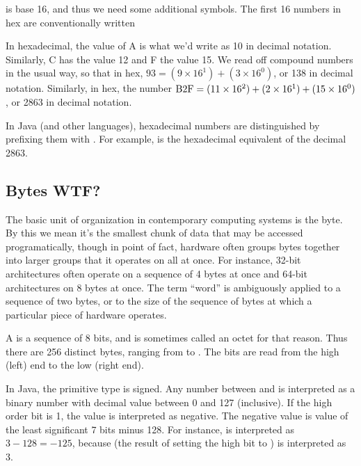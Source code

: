  is base 16, 
and thus we need some additional symbols.  The first 16 numbers in hex
are conventionally written


In hexadecimal, the value of A is what we'd write as 10 in decimal
notation.  Similarly, C has the value 12 and F the value 15.  We read
off compound numbers in the usual way, so that in hex, $93 = (9 \times
16^1) + (3 \times 16^0)$, or 138 in decimal notation.  Similarly, in
hex, the number $\mbox{\rm B2F} = (11 \times 16^2) + (2 \times 16^1) + (15 \times
16^0)$, or 2863 in decimal notation.

In Java (and other languages), hexadecimal
numbers are distinguished by prefixing
them with .  For example,
 is the hexadecimal equivalent of the decimal 2863.

\subsection{Bytes WTF?}\label{section:java-bytes} 


The basic unit of organization in contemporary computing systems is
the byte.  By this we mean it's the smallest chunk of data that may be
accessed programatically, though in point of fact, hardware often
groups bytes together into larger groups that it operates on all at
once.  For instance, 32-bit architectures often operate on a sequence
of 4 bytes at once and 64-bit architectures on 8 bytes at once.  The
term ``word'' is ambiguously applied to a sequence of two bytes, or to
the size of the sequence of bytes at which a particular piece of
hardware operates.

A  is a sequence of 8 bits, and is sometimes
called an octet for that reason.  Thus there are 256 distinct bytes,
ranging from  to .  The bits are read
from the high (left) end to the low (right end).

In Java, the  primitive type is
signed.  Any number between  and  is
interpreted as a binary number with decimal value between 0 and 127
(inclusive).  If the high order bit is 1, the value is interpreted as
negative.  The negative value is value of the least significant 7 bits
minus 128.  For instance,
 is interpreted as $3 - 128 = -125$, because
 (the result of setting the high bit to ) is interpreted as 3.

